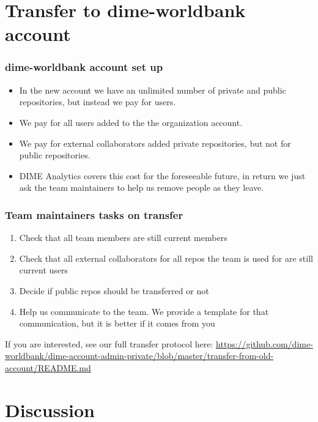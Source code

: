 \documentclass[aspectratio=169]{beamer} %
\begin{document}

\section{Transfer to dime-worldbank account}

\begin{frame}
	\frametitle{dime-worldbank account set up}
	
	\begin{itemize}
		\item In the new account we have an unlimited number of private and public repositories, but instead we pay for users.
		\item We pay for all users added to the the organization account.
		\item We pay for external collaborators added private repositories, but not for public repositories.
		\item DIME Analytics covers this cost for the foreseeable future, in return we just ask the team maintainers to help us remove people as they leave.
	\end{itemize}
\end{frame}


\begin{frame}
	\frametitle{Team maintainers tasks on transfer}
	
	\begin{enumerate}
		\item Check that all team members are still current members
		\item Check that all external collaborators for all repos the team is used for are still current users
		\item Decide if public repos should be transferred or not
		\item Help us communicate to the team. We provide a template for that communication, but it is better if it comes from you
	\end{enumerate}

	 If you are interested, see our full transfer protocol here: \url{https://github.com/dime-worldbank/dime-account-admin-private/blob/master/transfer-from-old-account/README.md}
\end{frame}


\section{Discussion}
\end{document}
